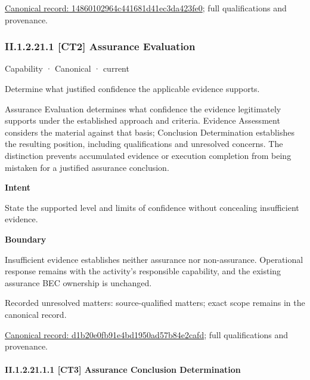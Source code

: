 {\footnotesize \href{../../../../continuum/strategy/capability/14860102964c441681d41ec3da423fe0.md}{Canonical record: 14860102964c441681d41ec3da423fe0}; full qualifications and provenance.}\par
\subsubsection*{II.1.2.21.1 [CT2] Assurance Evaluation}
\label{navigation:II.1.2.21.1}

\label{element:d1b20e0fb91e4bd1950ad57b84e2cafd}
{\small Capability · Canonical · current}\par

Determine what justified confidence the applicable evidence supports.



Assurance Evaluation determines what confidence the evidence legitimately supports under the established approach and criteria. Evidence Assessment considers the material against that basis; Conclusion Determination establishes the resulting position, including qualifications and unresolved concerns. The distinction prevents accumulated evidence or execution completion from being mistaken for a justified assurance conclusion.



\textbf{Intent}



State the supported level and limits of confidence without concealing insufficient evidence.



\textbf{Boundary}



Insufficient evidence establishes neither assurance nor non-assurance. Operational response remains with the activity's responsible capability, and the existing assurance BEC ownership is unchanged.


{\small Recorded unresolved matters: source-qualified matters; exact scope remains in the canonical record.}\par
{\footnotesize \href{../../../../continuum/strategy/capability/d1b20e0fb91e4bd1950ad57b84e2cafd.md}{Canonical record: d1b20e0fb91e4bd1950ad57b84e2cafd}; full qualifications and provenance.}\par
\paragraph*{II.1.2.21.1.1 [CT3] Assurance Conclusion Determination}
\label{navigation:II.1.2.21.1.1}

